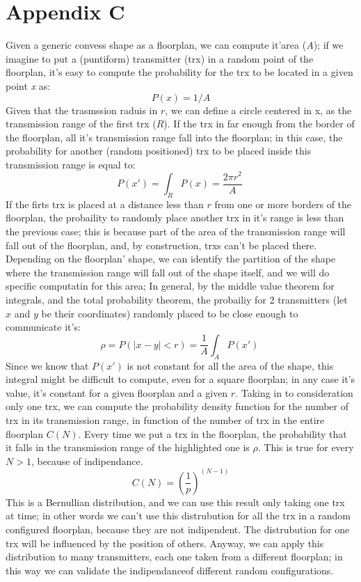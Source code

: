 \section*{Appendix C}
Given a generic convess shape as a floorplan, we can compute it'area ($A$); 
if we imagine to put a (puntiform) transmitter (trx) in a random point of the floorplan, 
it's easy to compute the probability for the trx to be located in a given 
point \textit{x} as:
\begin{equation*}
  P(x)=1/A
\end{equation*}
Given that the trasmssion raduis in $r$, we can define a circle centered in x, 
as the transmission range of the first trx ($R$). If the trx in far enough from 
the border of the floorplan, all it's transmission range fall into the floorplan; 
in this case, the probability for another (random positioned) trx to be placed 
inside this transmission range is equal to:
\begin{equation*}
  P(x') = \int_{R}^{} P(x)= \frac{2\pi r^2}{A} \ 
\end{equation*}
If the firts trx is placed at a distance less than $r$ from one or more borders of the floorplan,
the probaility to randomly place another trx in it's range is less than the previous case; this is 
because part of the area of the transmission range will fall out of the floorplan, and,
by construction, trxs can't be placed there. 
Depending on the floorplan' shape, we can identify the partition of the shape where the transmission range
will fall out of the shape itself, and we will do specific computatin for this area;
In general, by the middle value theorem for integrals, and the total probability theorem, the probailiy
for 2 transmitters (let $x$ and $y$ be their coordinates) randomly placed to be close enough to communicate it's:
\begin{equation*}
  \rho =P(|x-y|<r) = \frac{1}{A} \int_{A}^{} P(x') \ 
\end{equation*}
Since we know that $P(x')$ is not constant for all the area of the shape, this integral might be difficult to compute,
even for a square floorplan; in any case it's value, it's constant for a given floorplan and a given $r$.
Taking in to consideration only one trx, we can compute the probability density function for the number of trx in its
transmission range, in function of the number of trx in the entire floorplan $C(N)$. Every time we put
a trx in the floorplan, the probability that it falls in the transmission range of the highlighted one is $\rho$. This is true
for every $N > 1$, because of indipendance. 
\begin{equation*}
	C(N)= \left(\frac{1}{p}\right)^{\left( N-1 \right)}
  \end{equation*}
This is a Bernullian distribution, and we can use this result only taking one trx at time; in other words we can't use this 
distrubution for all the trx in a random configured floorplan, because they are not indipendent. 
The distrubution for one trx will be influenced by the position of others. 
Anyway, we can apply this distribution to many transmitters, each one taken from a different floorplan; in this way we can 
validate the indipendanceof different random configurations.\\
